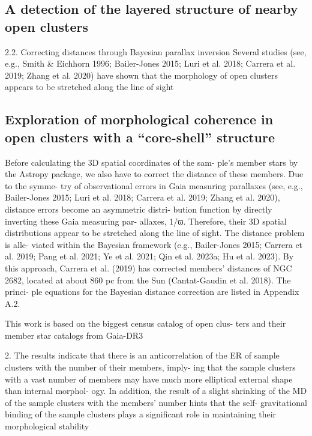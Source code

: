 \documentclass[../Main.tex]{subfiles}
\begin{document}
{\subsection{A detection of the layered structure of nearby open clusters}


2.2. Correcting distances through Bayesian parallax
inversion
Several studies (see, e.g., Smith & Eichhorn 1996; Bailer-Jones
2015; Luri et al. 2018; Carrera et al. 2019; Zhang et al. 2020)
have shown that the morphology of open clusters appears to be
stretched along the line of sight

\subsection{Exploration of morphological coherence in open clusters with a “core-shell” structure}


Before calculating the 3D spatial coordinates of the sam-
ple’s member stars by the Astropy package, we also have to
correct the distance of these members. Due to the symme-
try of observational errors in Gaia measuring parallaxes (see,
e.g., Bailer-Jones 2015; Luri et al. 2018; Carrera et al. 2019;
Zhang et al. 2020), distance errors become an asymmetric distri-
bution function by directly inverting these Gaia measuring par-
allaxes, 1/ϖ. Therefore, their 3D spatial distributions appear to
be stretched along the line of sight. The distance problem is alle-
viated within the Bayesian framework (e.g., Bailer-Jones 2015;
Carrera et al. 2019; Pang et al. 2021; Ye et al. 2021; Qin et al.
2023a; Hu et al. 2023). By this approach, Carrera et al. (2019)
has corrected members’ distances of NGC 2682, located at about
860 pc from the Sun (Cantat-Gaudin et al. 2018). The princi-
ple equations for the Bayesian distance correction are listed in
Appendix A.2.

This work is based on the biggest census catalog of open clus-
ters and their member star catalogs from Gaia-DR3

2. The results indicate that there is an anticorrelation of the
ER of sample clusters with the number of their members, imply-
ing that the sample clusters with a vast number of members may
have much more elliptical external shape than internal morphol-
ogy. In addition, the result of a slight shrinking of the MD of the
sample clusters with the members’ number hints that the self-
gravitational binding of the sample clusters plays a significant
role in maintaining their morphological stability

}
\end{document}
